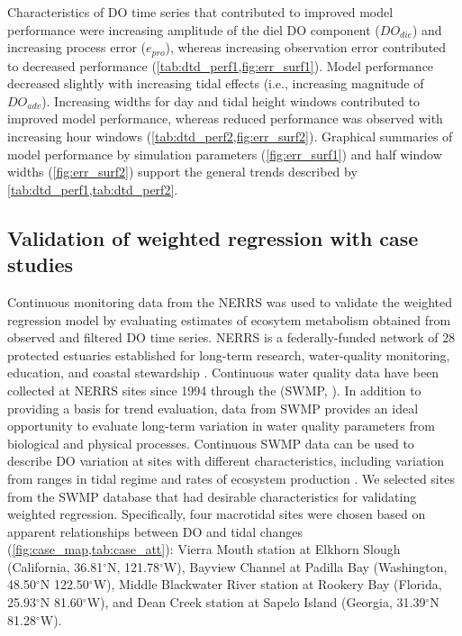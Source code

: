 \documentclass[letterpaper,12pt,oneside]{article}\usepackage[]{graphicx}\usepackage[]{color}
\begin{document}
Characteristics of \ac{DO} time series that contributed to improved model performance were increasing amplitude of the diel \ac{DO} component ($DO_{die}$) and increasing process error ($e_{pro}$), whereas increasing observation error contributed to decreased performance (\cref{tab:dtd_perf1,fig:err_surf1}).  Model performance decreased slightly with increasing tidal effects (i.e., increasing magnitude of $DO_{adv}$).  Increasing widths for day and tidal height windows contributed to improved model performance, whereas reduced performance was observed with increasing hour windows (\cref{tab:dtd_perf2,fig:err_surf2}).  Graphical summaries of model performance by simulation parameters (\cref{fig:err_surf1}) and half window widths (\cref{fig:err_surf2}) support the general trends described by \cref{tab:dtd_perf1,tab:dtd_perf2}.

\subsection{Validation of weighted regression with case studies}

Continuous monitoring data from the \acl{NERRS} was used to validate the weighted regression model by evaluating estimates of ecosytem metabolism obtained from observed and filtered \ac{DO} time series. \ac{NERRS} is a federally-funded network of 28 protected estuaries established for long-term research, water-quality monitoring, education, and coastal stewardship \citep{Wenner04}.  Continuous water quality data have been collected at \ac{NERRS} sites since 1994 through the  (\acs{SWMP}, ).  In addition to providing a basis for trend evaluation, data from \ac{SWMP} provides an ideal opportunity to evaluate long-term variation in water quality parameters from biological and physical processes.  Continuous \ac{SWMP} data can be used to describe \ac{DO} variation at sites with different characteristics, including variation from ranges in tidal regime \citep{Sanger02} and rates of ecosystem production \citep{Caffrey03,Caffrey04}.  We selected sites from the \ac{SWMP} database that had desirable characteristics for validating weighted regression.  Specifically, four macrotidal sites were chosen based on apparent relationships between \ac{DO} and tidal changes (\cref{fig:case_map,tab:case_att}): Vierra Mouth station at Elkhorn Slough (California, 36.81$^{\circ}$N, 121.78$^{\circ}$W), Bayview Channel at Padilla Bay (Washington, 48.50$^{\circ}$N 122.50$^{\circ}$W), Middle Blackwater River station at Rookery Bay (Florida, 25.93$^{\circ}$N 81.60$^{\circ}$W), and Dean Creek station at Sapelo Island (Georgia, 31.39$^{\circ}$N 81.28$^{\circ}$W).   
\end{document}
